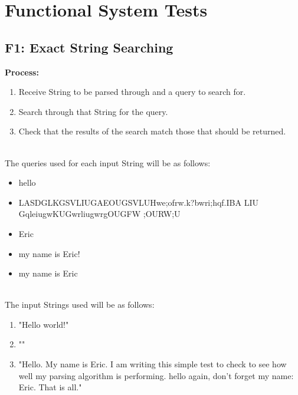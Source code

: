 \documentclass[12pt, titlepage]{article}
\begin{document}
\pagebreak



\section{Functional System Tests}
\subsection{F1: Exact String Searching}
\textbf{Process:}
\begin{enumerate}
\item{Receive String to be parsed through and a query to search for.}
\item{Search through that String for the query.}
\item{Check that the results of the search match those that should be returned.}
\end{enumerate}
~\\
The queries used for each input String will be as follows:
\begin{itemize}
\item{hello}
\item{LASDGLKGSVLIUGAEOUGSVLUHwe;ofrw.k?bwri;hqf.IBA LIU GqleiugwKUGwrliugwrgOUGFW	;OURW;U}
\item{Eric}
\item{my name is Eric!}
\item{my name is Eric}
\end{itemize}
~\\
The input Strings used will be as follows:
\begin{enumerate}
\item{"Hello world!"}
\item{""}
\item{"Hello. My name is Eric. I am writing this simple test to check to see how well my parsing algorithm is performing. hello again, don't forget my name: Eric. That is all."}
\end{enumerate}
\end{document}
